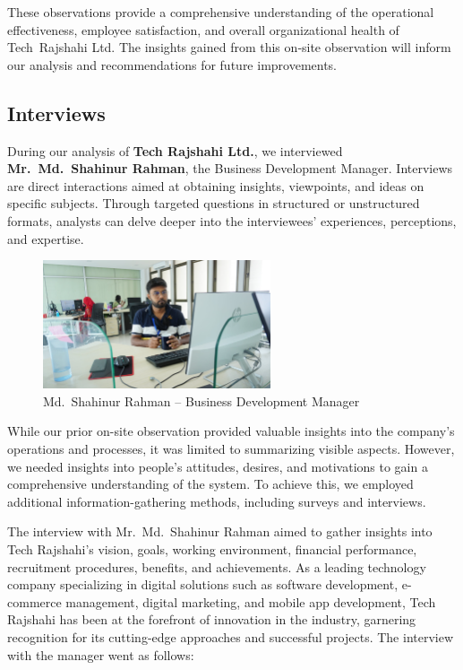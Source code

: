 \documentclass[12pt,a4paper]{article}
\begin{document}
These observations provide a comprehensive understanding of the operational effectiveness, employee satisfaction, and overall organizational health of Tech Rajshahi Ltd.  The insights gained from this on‑site observation will inform our analysis and recommendations for future improvements.

\subsection{Interviews}

During our analysis of \textbf{Tech Rajshahi Ltd.}, we interviewed \textbf{Mr.~Md.~Shahinur Rahman}, the Business Development Manager. Interviews are direct interactions aimed at obtaining insights, viewpoints, and ideas on specific subjects. Through targeted questions in structured or unstructured formats, analysts can delve deeper into the interviewees’ experiences, perceptions, and expertise.

\begin{figure}[H]
    \centering
    \includegraphics[width=0.6\textwidth]{Fig/bdm_shahinur_rahman.png}
    \caption{Md.\ Shahinur Rahman – Business Development Manager}
    \label{fig:bdm_shahinur_rahman}
\end{figure}

While our prior on-site observation provided valuable insights into the company’s operations and processes, it was limited to summarizing visible aspects. However, we needed insights into people’s attitudes, desires, and motivations to gain a comprehensive understanding of the system. To achieve this, we employed additional information-gathering methods, including surveys and interviews.

The interview with Mr.~Md.~Shahinur Rahman aimed to gather insights into Tech Rajshahi’s vision, goals, working environment, financial performance, recruitment procedures, benefits, and achievements. As a leading technology company specializing in digital solutions such as software development, e-commerce management, digital marketing, and mobile app development, Tech Rajshahi has been at the forefront of innovation in the industry, garnering recognition for its cutting-edge approaches and successful projects. The interview with the manager went as follows:
\end{document}
